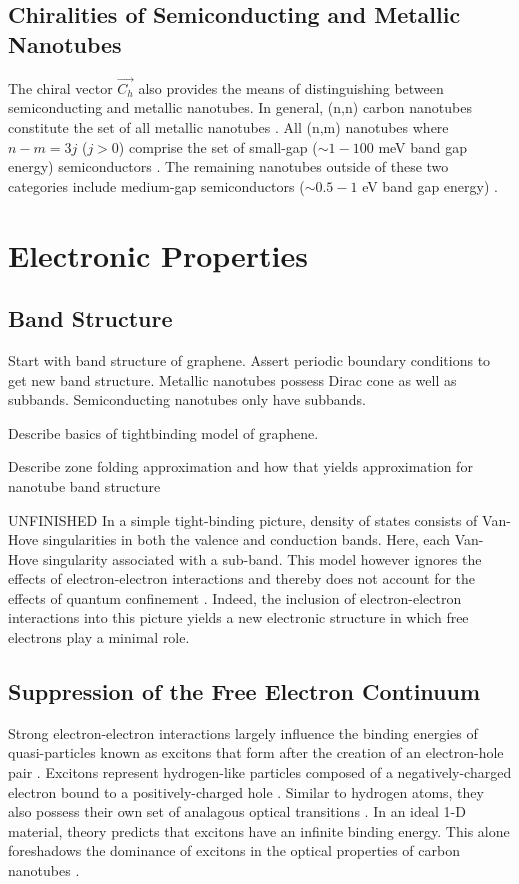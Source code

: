 \subsection{Chiralities of Semiconducting and Metallic Nanotubes}
The chiral vector $\vec{C_h}$ also provides the means of distinguishing between semiconducting and metallic nanotubes. In general, (n,n) carbon nanotubes constitute the set of all metallic nanotubes \cite{nanot2012optoelectronic}. All (n,m) nanotubes where $n-m = 3j$ ($j > 0$) comprise the set of small-gap ($\sim1 - 100$ meV band gap energy) semiconductors \cite{nanot2012optoelectronic}. The remaining nanotubes outside of these two categories include medium-gap semiconductors ($\sim0.5 - 1$ eV band gap energy) \cite{nanot2012optoelectronic}.


\section{Electronic Properties}

\subsection{Band Structure}


Start with band structure of graphene. Assert periodic boundary conditions to get new band structure. Metallic nanotubes possess Dirac cone as well as subbands. Semiconducting nanotubes only have subbands.

{\color{red} Describe basics of tightbinding model of graphene.}

{\color{red} Describe zone folding approximation and how that yields approximation for nanotube band structure}

{\color{red}UNFINISHED} In a simple tight-binding picture, density of states consists of Van-Hove singularities in both the valence and conduction bands. Here, each Van-Hove singularity associated with a sub-band. This model however ignores the effects of electron-electron interactions and thereby does not account for the effects of quantum confinement \cite{weismanKonoBook}. Indeed, the inclusion of electron-electron interactions into this picture yields a new electronic structure in which free electrons play a minimal role.

\subsection{Suppression of the Free Electron Continuum}
Strong electron-electron interactions largely influence the binding energies of quasi-particles known as excitons that form after the creation of an electron-hole pair \cite{koch2006semiconductor}. Excitons represent hydrogen-like particles composed of a negatively-charged electron bound to a positively-charged hole \cite{koch2006semiconductor}. Similar to hydrogen atoms, they also possess their own set of analagous optical transitions \cite{koch2006semiconductor}. In an ideal 1-D material, theory predicts that excitons have an infinite binding energy. This alone foreshadows the dominance of excitons in the optical properties of carbon nanotubes \cite{ando2005theory}. 

